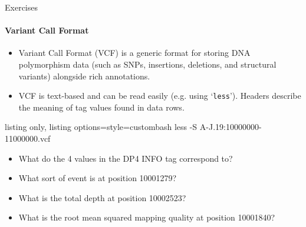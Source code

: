 \documentclass{beamer}
\begin{document}
\begin{frame}[fragile]{Exercises}
\framesubtitle{Variant Call Format}
\begin{itemize}
\item Variant Call Format (VCF) is a generic format for storing DNA polymorphism data (such as SNPs, insertions, deletions, and structural variants) alongside rich annotations.
\item VCF is text-based and can be read easily (e.g. using `\texttt{less}'). Headers describe the meaning of tag values found in data rows. 
\end{itemize}
\begin{tcblisting}{listing only, listing options={style=custombash}}
less -S A-J.19:10000000-11000000.vcf 
\end{tcblisting}
\begin{itemize}
\item What do the 4 values in the DP4 INFO tag correspond to?
\item What sort of event is at position 10001279?
\item What is the total depth at position 10002523?
\item What is the root mean squared mapping quality at position 10001840?
\end{itemize}
\end{frame}
\end{document}
